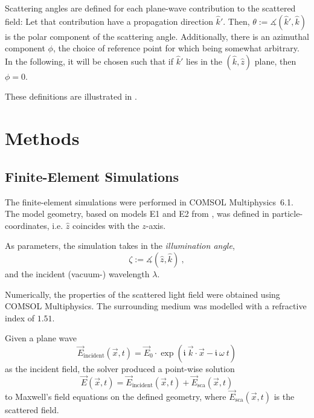 \documentclass[10pt]{article}
\begin{document}
\begin{multicols}{2}
Scattering angles are defined for each plane-wave contribution to the scattered field: 
Let that contribution have a propagation direction $\hat{k}'$. 
Then, \mbox{$\theta := \measuredangle( \hat{k}', \hat{k} )$} is the polar component of the scattering angle. 
Additionally, there is an azimuthal component $\phi$, the choice of reference point for which being somewhat arbitrary. 
In the following, it will be chosen such that if $\hat{k}'$ lies in the $(\hat{k},\hat{z})$ plane, then $\phi=0$.

These definitions are illustrated in . 



\section*{Methods}

\subsection*{Finite-Element Simulations}

The finite-element simulations were performed in COMSOL \mbox{Multiphysics 6.1}. 
The model geometry, based on models E1 and E2 from \cite{BA}, was defined in particle-coordinates, i.e. $\hat{z}$ coincides with the $z$-axis. 

As parameters, the simulation takes in the \emph{illumination angle}, 
$$
    \zeta := \measuredangle\left( \hat{z}, \hat{k} \right) \ ,
$$
and the incident (vacuum-) wavelength $\lambda$. 

Numerically, the properties of the scattered light field were obtained using COMSOL Multiphysics. 
The surrounding medium was modelled with a refractive index of $1.51$. 

Given a plane wave 
$$
    \vec{E}_\mathrm{incident}(\vec{x},t) = \vec{E}_0 \cdot \exp\!\left( \mathfrak{i}\ \vec{k}\cdot\vec{x} - \mathfrak{i}\ \omega\ t \right)
$$
as the incident field, the solver produced a point-wise solution 
$$
    \vec{E}(\vec{x},t) = \vec{E}_\mathrm{incident}(\vec{x},t) + \vec{E}_\mathrm{sca}(\vec{x},t)
$$ 
to Maxwell's field equations on the defined geometry, where $\vec{E}_\mathrm{sca}(\vec{x},t)$ is the scattered field. 


\end{multicols}
\end{document}
